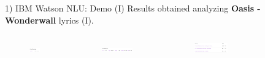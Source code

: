 \documentclass[xcolor=dvipsnames]{beamer}
\begin{document}
\begin{frame}{1) IBM Watson NLU: Demo (I)}
Results obtained analyzing \textbf{Oasis - Wonderwall} lyrics (I).
\begin{columns}
\begin{figure}
	\includegraphics[scale=0.3,left]{./images/sentiment}
\end{figure}
\begin{figure}
	\includegraphics[scale=0.3,left]{./images/emotion}
\end{figure}
\begin{figure}
	\includegraphics[scale=0.3,left]{./images/categories}
\end{figure}
\begin{figure}

\end{figure}
\end{columns}
\end{frame}
\end{document}

